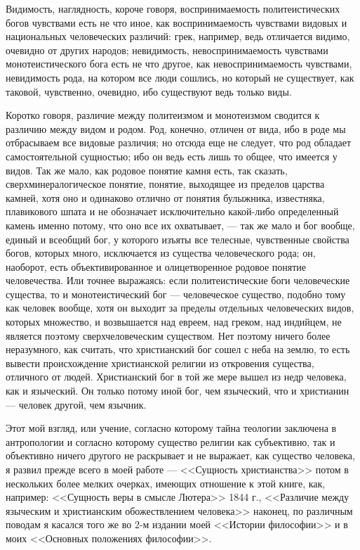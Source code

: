 \documentclass[12pt]{article}
\begin{document}
Видимость, наглядность, короче говоря, воспринимаемость политеистических богов чувствами есть не что иное, как воспринимаемость чувствами видовых и национальных человеческих различий: грек, например, ведь отличается видимо, очевидно от других народов; невидимость, невоспринимаемость чувствами монотеистического бога есть не что другое, как невоспринимаемость чувствами, невидимость рода, на котором все люди сошлись, но который не существует, как таковой, чувственно, очевидно, ибо существуют ведь только виды. 

Коротко говоря, различие между политеизмом и монотеизмом сводится к различию между видом и родом. Род, конечно, отличен от вида, ибо в роде мы отбрасываем все видовые различия; но отсюда еще не следует, что род обладает самостоятельной сущностью; ибо он ведь есть лишь то общее, что имеется у видов. Так же мало, как родовое понятие камня есть, так сказать, сверхминералогическое понятие, понятие, выходящее из пределов царства камней, хотя оно и одинаково отлично от понятия булыжника, известняка, плавикового шпата и не обозначает исключительно какой-либо определенный камень именно потому, что оно все их охватывает, --- так же мало и бог вообще, единый и всеобщий бог, у которого изъяты все телесные, чувственные свойства богов, которых много, исключается из существа человеческого рода; он, наоборот, есть объективированное и олицетворенное родовое понятие человечества. Или точнее выражаясь: если политеистические боги человеческие существа, то и монотеистический бог --- человеческое существо, подобно тому как человек вообще, хотя он выходит за пределы отдельных человеческих видов, которых множество, и возвышается над евреем, над греком, над индийцем, не является поэтому сверхчеловеческим существом. Нет поэтому ничего более неразумного, как считать, что христианский бог сошел с неба на землю, то есть вывести происхождение христианской религии из откровения существа, отличного от людей. Христианский бог в той же мере вышел из недр человека, как и языческий. Он только потому иной бог, чем языческий, что и христианин --- человек другой, чем язычник. 

Этот мой взгляд, или учение, согласно которому тайна теологии заключена в антропологии и согласно которому существо религии как субъективно, так и объективно ничего другого не раскрывает и не выражает, как существо человека, я развил прежде всего в моей работе --- <<Сущность христианства>>  потом в нескольких более мелких очерках, имеющих отношение к этой книге, как, например: <<Сущность веры в смысле Лютера>>  1844 г., <<Различие между языческим и христианским обожествлением человека>>  наконец, по различным поводам я касался того же во 2-м издании моей <<Истории философии>> и в моих <<Основных положениях философии>>. 
\end{document}
